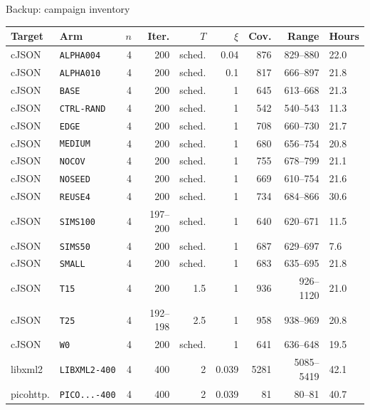 \documentclass[aspectratio=169,10pt]{beamer}
\newcommand{\arm}[1]{\texttt{#1}}
\begin{document}
\begin{frame}{Backup: campaign inventory}
  \centering
  \scriptsize
  \setlength{\tabcolsep}{4pt}
  \begin{tabular}{@{}llrrrrrrl@{}}
    \toprule
    Target & Arm & $n$ & Iter. & $T$ & $\xi$ & Cov. & Range & Hours \\
    \midrule
    cJSON & \arm{ALPHA004} & 4 & 200 & sched. & 0.04 & 876 & 829--880 & 22.0 \\
    cJSON & \arm{ALPHA010} & 4 & 200 & sched. & 0.1 & 817 & 666--897 & 21.8 \\
    cJSON & \arm{BASE} & 4 & 200 & sched. & 1 & 645 & 613--668 & 21.3 \\
    cJSON & \arm{CTRL-RAND} & 4 & 200 & sched. & 1 & 542 & 540--543 & 11.3 \\
    cJSON & \arm{EDGE} & 4 & 200 & sched. & 1 & 708 & 660--730 & 21.7 \\
    cJSON & \arm{MEDIUM} & 4 & 200 & sched. & 1 & 680 & 656--754 & 20.8 \\
    cJSON & \arm{NOCOV} & 4 & 200 & sched. & 1 & 755 & 678--799 & 21.1 \\
    cJSON & \arm{NOSEED} & 4 & 200 & sched. & 1 & 669 & 610--754 & 21.6 \\
    cJSON & \arm{REUSE4} & 4 & 200 & sched. & 1 & 734 & 684--866 & 30.6 \\
    cJSON & \arm{SIMS100} & 4 & 197--200 & sched. & 1 & 640 & 620--671 & 11.5 \\
    cJSON & \arm{SIMS50} & 4 & 200 & sched. & 1 & 687 & 629--697 & 7.6 \\
    cJSON & \arm{SMALL} & 4 & 200 & sched. & 1 & 683 & 635--695 & 21.8 \\
    cJSON & \arm{T15} & 4 & 200 & 1.5 & 1 & 936 & 926--1120 & 21.0 \\
    cJSON & \arm{T25} & 4 & 192--198 & 2.5 & 1 & 958 & 938--969 & 20.8 \\
    cJSON & \arm{W0} & 4 & 200 & sched. & 1 & 641 & 636--648 & 19.5 \\
    libxml2 & \arm{LIBXML2-400} & 4 & 400 & 2 & 0.039 & 5281 & 5085--5419 & 42.1 \\
    picohttp. & \arm{PICO...-400} & 4 & 400 & 2 & 0.039 & 81 & 80--81 & 40.7 \\
    \bottomrule
  \end{tabular}
\end{frame}
\end{document}
